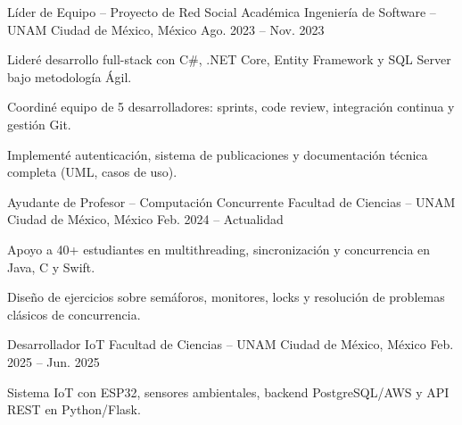 \begin{cventries}

  \cventry
    {Líder de Equipo – Proyecto de Red Social Académica}
    {Ingeniería de Software – UNAM}
    {Ciudad de México, México}
    {Ago. 2023 -- Nov. 2023}
    {
      \begin{cvitems}
        \item {Lideré desarrollo full-stack con C\#, .NET Core, Entity Framework y SQL Server bajo metodología Ágil.}
        \item {Coordiné equipo de 5 desarrolladores: sprints, code review, integración continua y gestión Git.}
        \item {Implementé autenticación, sistema de publicaciones y documentación técnica completa (UML, casos de uso).}
      \end{cvitems}
    }

  \cventry
    {Ayudante de Profesor – Computación Concurrente}
    {Facultad de Ciencias – UNAM}
    {Ciudad de México, México}
    {Feb. 2024 -- Actualidad}
    {
      \begin{cvitems}
        \item {Apoyo a 40+ estudiantes en multithreading, sincronización y concurrencia en Java, C y Swift.}
        \item {Diseño de ejercicios sobre semáforos, monitores, locks y resolución de problemas clásicos de concurrencia.}
      \end{cvitems}
    }

  \cventry
    {Desarrollador IoT}
    {Facultad de Ciencias – UNAM}
    {Ciudad de México, México}
    {Feb. 2025 -- Jun. 2025}
    {
      \begin{cvitems}
        \item {Sistema IoT con ESP32, sensores ambientales, backend PostgreSQL/AWS y API REST en Python/Flask.}
      \end{cvitems}
    }

\end{cventries}
